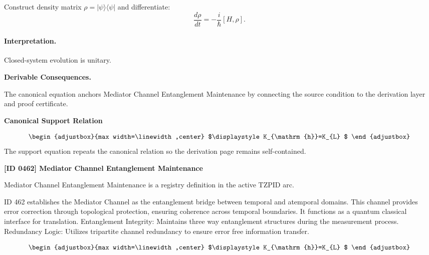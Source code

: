 Construct density matrix $\rho = |\psi\rangle\langle \psi|$ and differentiate:
\begin{equation}
\frac{d\rho}{dt} = -\frac{i}{\hbar}[H,\rho].
\end{equation}

\paragraph{Interpretation.}
Closed-system evolution is unitary.

\par\vspace{0.35em}
\noindent\textbf{Derivable Consequences.}\quad
\begingroup
\footnotesize
\raggedright
The canonical equation anchors Mediator Channel Entanglement Maintenance by connecting the source condition to the derivation layer and proof certificate.
\par\endgroup

\noindent\textbf{Canonical Support Relation}\par
\[
\begin{adjustbox}{max width=\linewidth,center}
$\displaystyle
K_{\mathrm{h}}=K_{L}
$
\end{adjustbox}
\]
\noindent The support equation repeats the canonical relation so the derivation page remains self-contained.\par

\clearpage
\noindent\textbf{[ID 0462] Mediator Channel Entanglement Maintenance}\par
\vspace{0.35em}
\begingroup\small
{}
Mediator Channel Entanglement Maintenance is a registry definition in the active TZPID arc.

ID 462 establishes the Mediator Channel as the entanglement bridge between temporal and atemporal domains. This channel provides error correction through topological protection, ensuring coherence across temporal boundaries. It functions as a quantum classical interface for translation. Entanglement Integrity: Maintains three way entanglement structures during the measurement process. Redundancy Logic: Utilizes tripartite channel redundancy to ensure error free information transfer.

\[
\begin{adjustbox}{max width=\linewidth,center}
$\displaystyle
K_{\mathrm{h}}=K_{L}
$
\end{adjustbox}
\]

